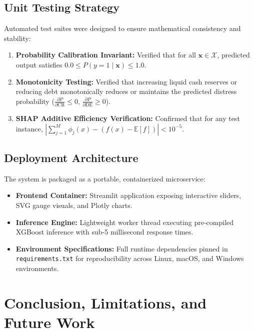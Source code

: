 \documentclass[11pt, a4paper]{article}
\begin{document}
\subsection{Unit Testing Strategy}
Automated test suites were designed to ensure mathematical consistency and stability:
\begin{enumerate}
    \item \textbf{Probability Calibration Invariant:} Verified that for all $\mathbf{x} \in \mathcal{X}$, predicted output satisfies $0.0 \le P(y=1 \mid \mathbf{x}) \le 1.0$.
    \item \textbf{Monotonicity Testing:} Verified that increasing liquid cash reserves or reducing debt monotonically reduces or maintains the predicted distress probability ($\frac{\partial P}{\partial \text{CR}} \le 0, \, \frac{\partial P}{\partial \text{DE}} \ge 0$).
    \item \textbf{SHAP Additive Efficiency Verification:} Confirmed that for any test instance, $\left| \sum_{j=1}^M \phi_j(x) - (f(x) - \mathbb{E}[f]) \right| < 10^{-5}$.
\end{enumerate}

\subsection{Deployment Architecture}
The system is packaged as a portable, containerized microservice:
\begin{itemize}
    \item \textbf{Frontend Container:} Streamlit application exposing interactive sliders, SVG gauge visuals, and Plotly charts.
    \item \textbf{Inference Engine:} Lightweight worker thread executing pre-compiled XGBoost inference with sub-5 millisecond response times.
    \item \textbf{Environment Specifications:} Full runtime dependencies pinned in \texttt{requirements.txt} for reproducibility across Linux, macOS, and Windows environments.
\end{itemize}

\clearpage

\section{Conclusion, Limitations, and Future Work}
\end{document}
